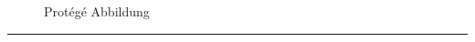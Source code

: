 \begin{figure}[H]
\centering {}
\caption{Protégé Abbildung\label{fig:protege}\protect\footnotemark}
\end{figure}


\vspace{0.1pt}
\noindent\rule[1ex]{\textwidth}{1pt}





